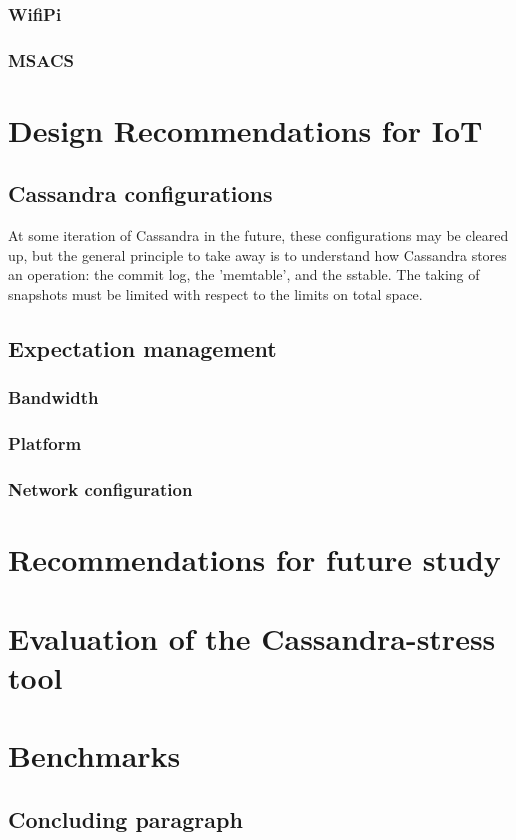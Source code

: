 \subsubsection{WifiPi}
\subsubsection{MSACS}
\section{Design Recommendations for IoT}
\subsection{Cassandra configurations}
At some iteration of Cassandra in the future, these configurations may be cleared up, but the general principle to take away is to understand how Cassandra stores an operation: the commit log, the 'memtable', and the \gls{sstable}.
The taking of snapshots must be limited with respect to the limits on total space.
\subsection{Expectation management}
\subsubsection{Bandwidth}
\subsubsection{Platform}
\subsubsection{Network configuration}
\section{Recommendations for future study}
\section{Evaluation of the Cassandra-stress tool}
\section{Benchmarks}
\subsection{Concluding paragraph}